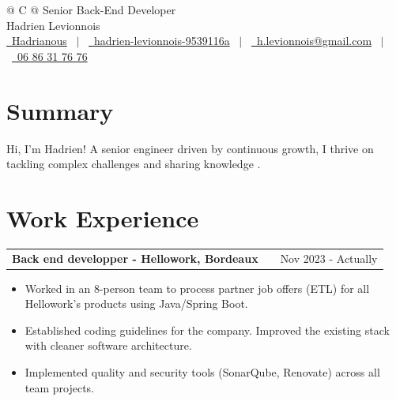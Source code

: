 \documentclass[a4paper,10pt]{article}
\makeatletter
\newenvironment{jobshort}[2]
{
    \begin{tabularx}{\linewidth}{@{}l X r@{}}
    \textbf{#1} & \hfill &  #2 \\[3.75pt]
    \end{tabularx}
    \begin{minipage}[t]{\linewidth}
    \begin{itemize}[nosep,leftmargin=1em,label=--]
}
{
    \end{itemize}
    \end{minipage}
}
\makeatother
\begin{document}
    \pagestyle{empty}



    \begin{tabularx}{\linewidth}{@{} C @{}}
        \Huge{Senior Back-End Developer} \\[7.5pt]
        \Large{Hadrien Levionnois} \\[7.5pt]
        \href{https://github.com/Hadrianous}{\raisebox{-0.05\height}\faGithub\ Hadrianous} \ $|$ \
        \href{https://linkedin.com/in/hadrien-levionnois-9539116a}{\raisebox{-0.05\height}\faLinkedin\ hadrien-levionnois-9539116a} \ $|$ \
        \href{mailto:h.levionnois@gmail.com}{\raisebox{-0.05\height}\faEnvelope \ h.levionnois@gmail.com} \ $|$ \
        \href{tel:+336 86 31 76 76}{\raisebox{-0.05\height}\faMobile \ 06 86 31 76 76} \\
    \end{tabularx}


    \section{Summary}
    Hi, I'm Hadrien! A senior engineer driven by continuous growth, I thrive on tackling complex challenges and sharing knowledge .


    \section{Work Experience}

    \begin{jobshort}{Back end developper - Hellowork, Bordeaux}{Nov 2023 - Actually}
        \begin{itemize}
            \item Worked in an 8-person team to process partner job offers (ETL) for all Hellowork's products using Java/Spring Boot.
            \item Established coding guidelines for the company. Improved the existing stack with cleaner software architecture.
            \item Implemented quality and security tools (SonarQube, Renovate) across all team projects.
        \end{itemize}
    \end{jobshort}
\end{document}
